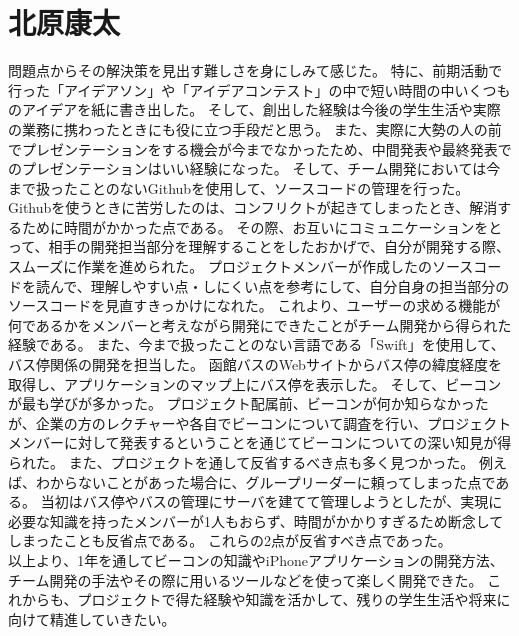 \documentclass[openany,11pt,papersize]{jsbook}
\begin{document}

\section{北原康太}
問題点からその解決策を見出す難しさを身にしみて感じた。
特に、前期活動で行った「アイデアソン」や「アイデアコンテスト」の中で短い時間の中いくつものアイデアを紙に書き出した。
そして、創出した経験は今後の学生生活や実際の業務に携わったときにも役に立つ手段だと思う。
また、実際に大勢の人の前でプレゼンテーションをする機会が今までなかったため、中間発表や最終発表でのプレゼンテーションはいい経験になった。
そして、チーム開発においては今まで扱ったことのないGithubを使用して、ソースコードの管理を行った。
Githubを使うときに苦労したのは、コンフリクトが起きてしまったとき、解消するために時間がかかった点である。
その際、お互いにコミュニケーションをとって、相手の開発担当部分を理解することをしたおかげで、自分が開発する際、スムーズに作業を進められた。
プロジェクトメンバーが作成したのソースコードを読んで、理解しやすい点・しにくい点を参考にして、自分自身の担当部分のソースコードを見直すきっかけになれた。
これより、ユーザーの求める機能が何であるかをメンバーと考えながら開発にできたことがチーム開発から得られた経験である。
また、今まで扱ったことのない言語である「Swift」を使用して、バス停関係の開発を担当した。
函館バスのWebサイトからバス停の緯度経度を取得し、アプリケーションのマップ上にバス停を表示した。
そして、ビーコンが最も学びが多かった。
プロジェクト配属前、ビーコンが何か知らなかったが、企業の方のレクチャーや各自でビーコンについて調査を行い、プロジェクトメンバーに対して発表するということを通じてビーコンについての深い知見が得られた。
また、プロジェクトを通して反省するべき点も多く見つかった。
例えば、わからないことがあった場合に、グループリーダーに頼ってしまった点である。
当初はバス停やバスの管理にサーバを建てて管理しようとしたが、実現に必要な知識を持ったメンバーが1人もおらず、時間がかかりすぎるため断念してしまったことも反省点である。
これらの2点が反省すべき点であった。
\\以上より、1年を通してビーコンの知識やiPhoneアプリケーションの開発方法、チーム開発の手法やその際に用いるツールなどを使って楽しく開発できた。
これからも、プロジェクトで得た経験や知識を活かして、残りの学生生活や将来に向けて精進していきたい。

\end{document}
